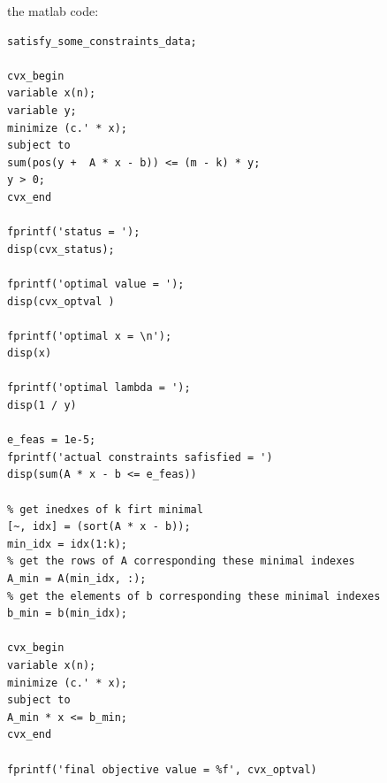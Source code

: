 \documentclass{article}
\begin{document}
the matlab code:\\
\begin{verbatim}
satisfy_some_constraints_data;

cvx_begin
variable x(n);
variable y;
minimize (c.' * x);
subject to
sum(pos(y +  A * x - b)) <= (m - k) * y;
y > 0;
cvx_end

fprintf('status = '); 
disp(cvx_status);

fprintf('optimal value = '); 
disp(cvx_optval )

fprintf('optimal x = \n'); 
disp(x)

fprintf('optimal lambda = '); 
disp(1 / y)

e_feas = 1e-5;
fprintf('actual constraints safisfied = ')
disp(sum(A * x - b <= e_feas))

% get inedxes of k firt minimal 
[~, idx] = (sort(A * x - b));
min_idx = idx(1:k);
% get the rows of A corresponding these minimal indexes
A_min = A(min_idx, :);
% get the elements of b corresponding these minimal indexes
b_min = b(min_idx);

cvx_begin
variable x(n);
minimize (c.' * x);
subject to
A_min * x <= b_min;
cvx_end

fprintf('final objective value = %f', cvx_optval)

\end{verbatim}
\end{document}
